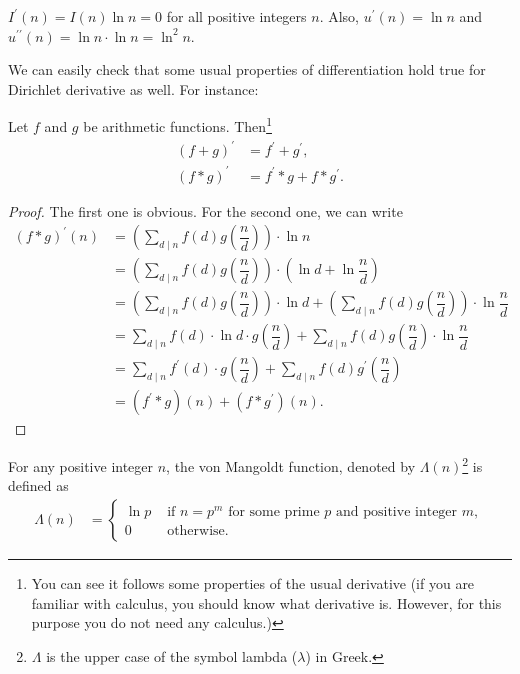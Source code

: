\documentclass{subfile}
\begin{document}
	\begin{example}
		$I^\prime(n)=I(n)\ln n=0$ for all positive integers $n$. Also, $u^\prime(n)=\ln n$ and $u^{\prime\prime}(n)=\ln n\cdot\ln n=\ln^2 n$.
	\end{example}
We can easily check that some usual properties of differentiation hold true for Dirichlet derivative as well. For instance:
	\begin{proposition}
		Let $f$ and $g$ be arithmetic functions. Then\footnote{You can see it follows some properties of the usual derivative (if you are familiar with calculus, you should know what derivative is. However, for this purpose you do not need any calculus.)}
			\begin{align*}
				(f+g)^\prime & =f^\prime+g^\prime,\\
				(f\ast g)^\prime& =f^\prime \ast g + f\ast g^\prime.
			\end{align*}
	\end{proposition}
	\begin{proof}
		The first one is obvious. For the second one, we can write
			\begin{align*}
				(f\ast g)^\prime (n)
					&= \left(\sum_{d\mid n} f(d)g\left(\dfrac{n}{d}\right)\right) \cdot \ln n\\
					&= \left(\sum_{d\mid n} f(d)g\left(\dfrac{n}{d}\right)\right) \cdot \left(\ln d + \ln \dfrac{n}{d}\right)\\
					&= \left(\sum_{d\mid n} f(d)g\left(\dfrac{n}{d}\right)\right) \cdot \ln d + \left(\sum_{d\mid n} f(d)g\left(\dfrac{n}{d}\right)\right) \cdot \ln \dfrac{n}{d}\\
					&= \sum_{d\mid n} f(d)\cdot \ln d \cdot g\left(\dfrac{n}{d}\right)+ \sum_{d\mid n} f(d) g\left(\dfrac{n}{d}\right) \cdot \ln \dfrac{n}{d}\\
					&= \sum_{d\mid n} f^\prime(d) \cdot g\left(\dfrac{n}{d}\right)+ \sum_{d\mid n} f(d) g^\prime\left(\dfrac{n}{d}\right)\\
					&= (f^\prime \ast g)(n) + (f\ast g^\prime)(n).
			\end{align*}

	\end{proof}
	\begin{definition}
		For any positive integer $n$, the von Mangoldt function, denoted by $\Lambda(n)$\footnote{$\Lambda$ is the upper case of the symbol lambda ($\lambda$) in Greek.} is defined as
			\begin{align*}
				\Lambda(n) & =
					\begin{cases}\ln p &\mbox{ if }n=p^m\mbox{ for  some prime }p\mbox{ and positive integer }m,\\0&\mbox{ otherwise}.\end{cases}
			\end{align*}
	\end{definition}
\end{document}
